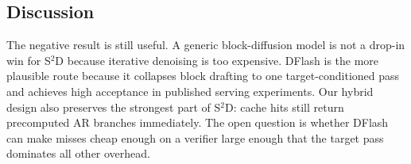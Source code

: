 \subsection{Discussion}

The negative result is still useful. A generic block-diffusion model is not a
drop-in win for S$^2$D because iterative denoising is too expensive. DFlash is
the more plausible route because it collapses block drafting to one
target-conditioned pass and achieves high acceptance in published serving
experiments. Our hybrid design also preserves the strongest part of S$^2$D:
cache hits still return precomputed AR branches immediately. The open question
is whether DFlash can make misses cheap enough on a verifier large enough that
the target pass dominates all other overhead.
